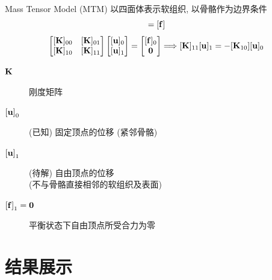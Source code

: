 \documentclass{beamer}
\begin{document}
\begin{frame}{Mass Tensor Model (MTM)}
  以四面体表示软组织, 以骨骼作为边界条件
  \begin{equation*}
    [\vb{K}] [\vb{u}] = [\vb{f}]
  \end{equation*}
  \begin{equation*}
    \begin{bmatrix}
      [\vb{K}]_{00} & [\vb{K}]_{01} \\
      [\vb{K}]_{10} & [\vb{K}]_{11}
    \end{bmatrix}
    \begin{bmatrix}
      [\vb{u}]_0 \\
      [\vb{u}]_1
    \end{bmatrix}
    =
    \begin{bmatrix}
      [\vb{f}]_0 \\
      \vb{0}
    \end{bmatrix}
    \Longrightarrow[\vb{K}]_{11} [\vb{u}]_1 = - [\vb{K}_{10}] [\vb{u}]_0
  \end{equation*}
  \begin{description}
    \item[$\vb{K}$] 刚度矩阵
    \item[$\bqty{\vb{u}}_0$] (已知) 固定顶点的位移 (紧邻骨骼)
    \item[$\bqty{\vb{u}}_1$] (待解) 自由顶点的位移 \\
          (不与骨骼直接相邻的软组织及表面)
    \item[$\bqty{\vb{f}}_1 = \bm{0}$] 平衡状态下自由顶点所受合力为零
  \end{description}
\end{frame}

\section{结果展示}
\end{document}
